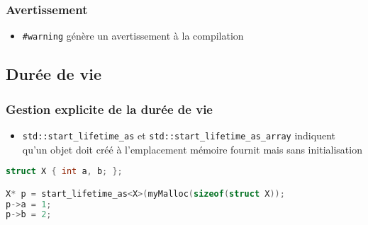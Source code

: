 \documentclass[C++.tex]{subfiles}
\begin{document}
\begin{frame}[fragile]
	\frametitle{Avertissement}
	\begin{itemize}
		\item \lstinline|#warning| génère un avertissement à la compilation

	\end{itemize}
\end{frame}

\subsection*{Durée de vie}
\begin{frame}[fragile]
	\frametitle{Gestion explicite de la durée de vie}
	\begin{itemize}
		\item \lstinline|std::start_lifetime_as| et \lstinline|std::start_lifetime_as_array| indiquent qu'un objet doit créé à l'emplacement mémoire fournit mais sans initialisation
	\end{itemize}

	\begin{lstlisting}[language=C++]
struct X { int a, b; };

X* p = start_lifetime_as<X>(myMalloc(sizeof(struct X));
p->a = 1;
p->b = 2;\end{lstlisting}
\end{frame}
\end{document}

